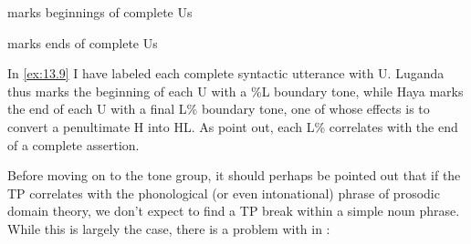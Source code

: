\documentclass[output=paper]{langsci/langscibook}
\begin{document}
\ea\label{ex:13.9}
    \ea {} marks beginnings of complete Us\\

    \ex {} marks ends of complete Us\\
    \z
\z
In \eqref{ex:13.9} I have labeled each complete syntactic utterance with U.
Luganda thus marks the beginning of each U with a \%L boundary tone, while Haya
marks the end of each U with a final L\% boundary tone, one of whose effects is
to convert a penultimate H into HL. As \citet{ByarushengoHymanTenenbaum1976} point out,
each L\% correlates with the end of a complete assertion.

Before moving on to the tone group, it should perhaps be pointed out that if
the TP correlates with the phonological (or even intonational)
phrase of
prosodic domain theory, we don’t expect to find a TP break
within a simple noun phrase. While this is largely the case, there is a problem
with  in :
\end{document}
